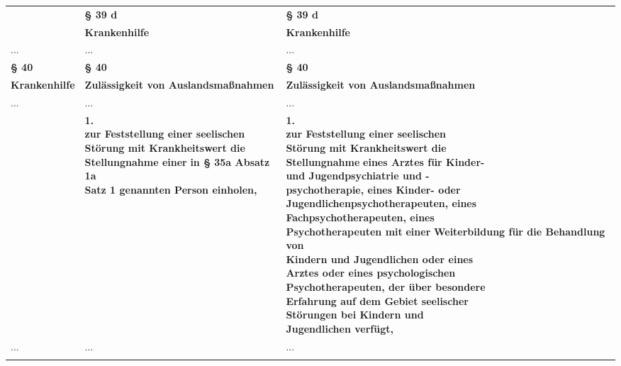 \documentclass[10pt,a4paper,landscape]{article}
\begin{document}
\begin{longtable}{|L{8.2cm}|L{8.2cm}|L{8.2cm}|}
 & \textbf{\S{} 39 d } & \textbf{\S{} 39 d } \\
\hhline{|---|}
 & \textbf{Krankenhilfe } & \textbf{Krankenhilfe } \\
\hhline{|---|}
... & ... & ... \\
\hhline{|---|}
\textbf{\S{} 40} & \textbf{\S{} 40} & \textbf{\S{} 40} \\
\hhline{|---|}
\textbf{\textcolor{diffred}{Krankenhilfe}} & \textbf{Zulässigkeit von Auslandsmaßnahmen } & \textbf{Zulässigkeit von Auslandsmaßnahmen } \\
\hhline{|---|}
... & ... & ... \\
\hhline{|---|}
 & \textbf{1.   \newline zur Feststellung einer seelischen  \newline Störung mit Krankheitswert die  \newline Stellungnahme einer }\textbf{\textcolor{diffred}{in \S{} 35a Absatz 1a  \newline Satz 1 genannten Person einholen,}} & \textbf{1.   \newline zur Feststellung einer seelischen  \newline Störung mit Krankheitswert die  \newline Stellungnahme }\textbf{\textcolor{diffgreen}{eines Arztes für Kinder-  \newline und Jugendpsychiatrie und - \newline psychotherapie, eines Kinder- oder  \newline Jugendlichenpsychotherapeuten, eines  \newline Fachpsychotherapeuten, eines  \newline Psychotherapeuten mit}}\textbf{ einer} \newline \textbf{\textcolor{diffgreen}{Weiterbildung für die Behandlung von  \newline Kindern und Jugendlichen oder eines  \newline Arztes oder eines psychologischen  \newline Psychotherapeuten, der über besondere  \newline Erfahrung auf dem Gebiet seelischer  \newline Störungen bei Kindern und  \newline Jugendlichen verfügt,}} \\
\hhline{|---|}
... & ... & ... \\
\hhline{|---|}

\end{longtable}
\end{document}
